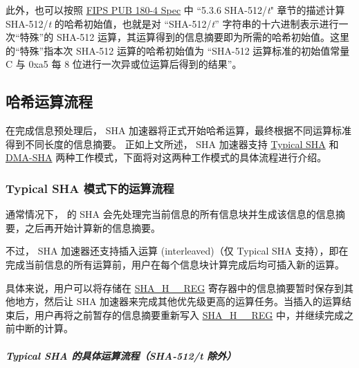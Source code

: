 \documentclass[main\_\_CN.tex]{subfiles}
\begin{document}
此外，也可以按照 \href{https://doi.org/10.6028/NIST.FIPS.180-4}{FIPS PUB 180-4 Spec} 中 ``5.3.6 SHA-512/{\it{t}}" 章节的描述计算 SHA-512/{\it{t}} 的哈希初始值，也就是对 “SHA-512/{\it{t}}” 字符串的十六进制表示进行一次“特殊”的 SHA-512 运算，其运算得到的信息摘要即为所需的哈希初始值。这里的“特殊”指本次 SHA-512 运算的哈希初始值为 “SHA-512 运算标准的初始值常量 C 与 0xa5 每 8 位进行一次异或位运算后得到的结果”。

\subsection{哈希运算流程}\label{sec:sha-hash-operation}

在完成信息预处理后，\chipname{} SHA 加速器将正式开始哈希运算，最终根据不同运算标准得到不同长度的信息摘要。
正如上文所述，\chipname{} SHA 加速器支持 \hyperref[sec:sha-typical-sha]{Typical SHA} 和 \hyperref[sec:sha-dma-sha]{DMA-SHA} 两种工作模式，下面将对这两种工作模式的具体流程进行介绍。

\subsubsection{Typical SHA 模式下的运算流程}\label{sec:sha-typical-sha}

通常情况下，\chipname{} 的 SHA 会先处理完当前信息的所有信息块并生成该信息的信息摘要，之后再开始计算新的信息摘要。

不过，\chipname{} SHA 加速器还支持插入运算 (interleaved)（仅 Typical SHA 支持），即在完成当前信息的所有运算前，用户在每个信息块计算完成后均可插入新的运算。

具体来说，用户可以将存储在 \hyperref[regdesc:SHAHNREG]{SHA\_H\_\_REG} 寄存器中的信息摘要暂时保存到其他地方，然后让 SHA 加速器来完成其他优先级更高的运算任务。当插入的运算结束后，用户再将之前暂存的信息摘要重新写入 \hyperref[regdesc:SHAHNREG]{SHA\_H\_\_REG} 中，并继续完成之前中断的计算。

\subparagraph{Typical SHA 的具体运算流程（SHA-512/{\it{t}} 除外）}
\end{document}
